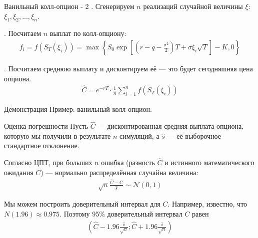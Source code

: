 \documentclass{beamer}
\begin{document}
\begin{frame}{Ванильный колл-опцион - 2}
. Сгенерируем $n$ реализаций случайной величины $\xi$: $\xi_1, \xi_2, ..., \xi_n$. 

. Посчитаем $n$ выплат по колл-опциону:
\begin{align*}
f_i = f(S_T(\xi_i)) = \max\left\{S_0 \exp\left[\left(r - q - \frac{\sigma^2}{2}\right)T + \sigma\xi_i\sqrt{T}\right] - K, 0\right\}
\end{align*}

. Посчитаем среднюю выплату и дисконтируем её --- это будет сегодняшняя цена опциона.
\begin{align*}
\hat{C} = e^{-rT} \cdot \frac{1}{n}\sum\limits_{i=1}^{n}f(S_T(\xi_i))
\end{align*}
\end{frame}



\begin{frame}{Демонстрация}
\justify
Пример: ванильный колл-опцион.
\end{frame}



\begin{frame}{Оценка погрешности}
\justify
Пусть $\hat{C}$ --- дисконтированная средняя выплата 	опциона, которую мы получили в результате $n$ симуляций, а $\hat{s}$ --- её выборочное стандартное отклонение.

\justify
Согласно ЦПТ, при больших $n$ ошибка (разность $\hat{C}$ и истинного математического ожидания $C$) --- нормально распределённая случайна величина:
\begin{align*}
\sqrt{n}\frac{\hat{C} - C}{\hat{s}} \sim \mathcal{N}(0, 1)
\end{align*}

\justify
Мы можем построить доверительный интервал для $C$. Например, известно, что $N(1.96) \approx 0.975$. Поэтому 95\% доверительный интервал $C$ равен
\begin{align*}
\left(\hat{C} - 1.96\frac{\hat{s}}{\sqrt{n}}; \hat{C} + 1.96\frac{\hat{s}}{\sqrt{n}} \right)
\end{align*}  
\end{frame}
\end{document}
